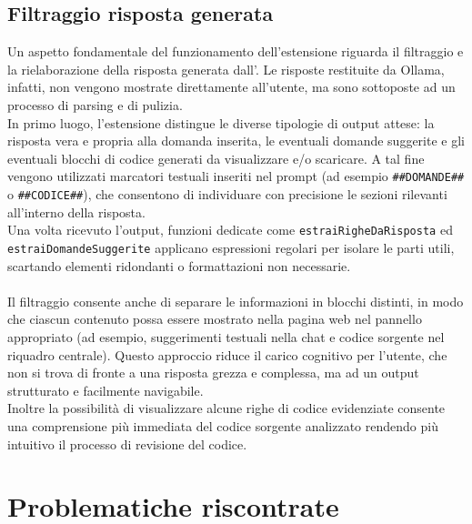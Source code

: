 \subsection{Filtraggio risposta generata}
\noindent Un aspetto fondamentale del funzionamento dell'estensione riguarda il filtraggio e la rielaborazione della risposta generata dall’. Le risposte restituite da Ollama, infatti, non vengono mostrate direttamente all’utente, ma sono sottoposte ad un processo di parsing e di pulizia.\\
In primo luogo, l’estensione distingue le diverse tipologie di output attese: la risposta vera e propria alla domanda inserita, le eventuali domande suggerite e gli eventuali blocchi di codice generati da visualizzare e/o scaricare. A tal fine vengono utilizzati marcatori testuali inseriti nel prompt (ad esempio \texttt{\#\#DOMANDE\#\#} o \texttt{\#\#CODICE\#\#}), che consentono di individuare con precisione le sezioni rilevanti all’interno della risposta. \\Una volta ricevuto l’output, funzioni dedicate come \texttt{estraiRigheDaRisposta} ed \texttt{estraiDomandeSuggerite} applicano espressioni regolari per isolare le parti utili, scartando elementi ridondanti o formattazioni non necessarie.\\
\\
Il filtraggio consente anche di separare le informazioni in blocchi distinti, in modo che ciascun contenuto possa essere mostrato nella pagina web nel pannello appropriato (ad esempio, suggerimenti testuali nella chat e codice sorgente nel riquadro centrale). Questo approccio riduce il carico cognitivo per l’utente, che non si trova di fronte a una risposta grezza e complessa, ma ad un output strutturato e facilmente navigabile.\\ Inoltre la possibilità di visualizzare alcune righe di codice evidenziate consente una comprensione più immediata del codice sorgente analizzato rendendo più intuitivo il processo di revisione del codice.

\section{Problematiche riscontrate}